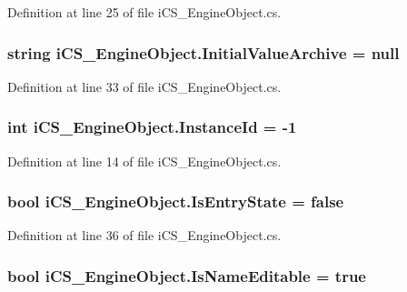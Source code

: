 Definition at line 25 of file i\+C\+S\+\_\+\+Engine\+Object.\+cs.

\hypertarget{classi_c_s___engine_object_aa3ffd99fe049364b3e8c0a9e304d265e}{
\subsubsection[{Initial\+Value\+Archive}]{\setlength{\rightskip}{0pt plus 5cm}string i\+C\+S\+\_\+\+Engine\+Object.\+Initial\+Value\+Archive = null}}\label{classi_c_s___engine_object_aa3ffd99fe049364b3e8c0a9e304d265e}


Definition at line 33 of file i\+C\+S\+\_\+\+Engine\+Object.\+cs.

\hypertarget{classi_c_s___engine_object_a398fa6ad047699d80896459fe629d3cc}{
\subsubsection[{Instance\+Id}]{\setlength{\rightskip}{0pt plus 5cm}int i\+C\+S\+\_\+\+Engine\+Object.\+Instance\+Id = -\/1}}\label{classi_c_s___engine_object_a398fa6ad047699d80896459fe629d3cc}


Definition at line 14 of file i\+C\+S\+\_\+\+Engine\+Object.\+cs.

\hypertarget{classi_c_s___engine_object_ab8228f2f04080f03659c49e5e5f61f0e}{
\subsubsection[{Is\+Entry\+State}]{\setlength{\rightskip}{0pt plus 5cm}bool i\+C\+S\+\_\+\+Engine\+Object.\+Is\+Entry\+State = false}}\label{classi_c_s___engine_object_ab8228f2f04080f03659c49e5e5f61f0e}


Definition at line 36 of file i\+C\+S\+\_\+\+Engine\+Object.\+cs.

\hypertarget{classi_c_s___engine_object_a4bf79b381a7e93639c64d0745df6d82f}{
\subsubsection[{Is\+Name\+Editable}]{\setlength{\rightskip}{0pt plus 5cm}bool i\+C\+S\+\_\+\+Engine\+Object.\+Is\+Name\+Editable = true}}\label{classi_c_s___engine_object_a4bf79b381a7e93639c64d0745df6d82f}


